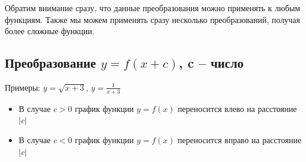 Обратим внимание сразу, что данные преобразования можно применять к любым функциям. Также мы можем применять сразу несколько преобразований, получая более сложные функции.

\subsection{Преобразование $y = f (x + c)$, c   – число}

Примеры: $y=\sqrt{x+3}$, $y=\frac{1}{x+3}$

\begin{itemize}
    \item В случае $c > 0$ график функции $y = f (x)$ переносится влево на расстояние $|c|$
    \item В случае $c < 0$ график функции $y = f (x)$ переносится вправо на расстояние $|c|$
\end{itemize}

\begin{figure}[h!]
	\begin{minipage}[h]{0.49\linewidth}
	\end{minipage}
	\hfill
	\begin{minipage}[h]{0.49\linewidth}
	\end{minipage}
	\label{ris:image1}
\end{figure}

